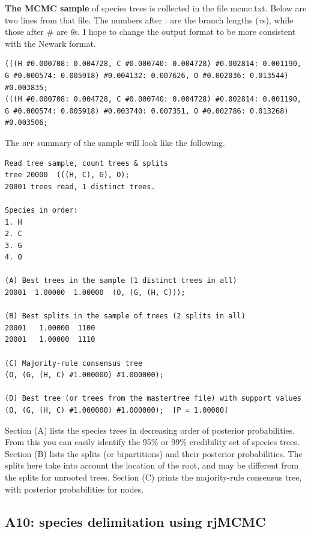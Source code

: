 \documentclass[a4paper]{book}
\numberwithin{equation}{section} \renewcommand{\baselinestretch}{0.55}
\begin{document}
\textbf{The MCMC sample} of species trees is collected in the file
mcmc.txt.  Below are two lines from that file.  The numbers after :
are the branch lengths ($\tau$s), while those after \# are $\theta$s.
I hope to change the output format to be more consistent with the
Newark format.

\begin{verbatim}
(((H #0.000708: 0.004728, C #0.000740: 0.004728) #0.002814: 0.001190, G #0.000574: 0.005918) #0.004132: 0.007626, O #0.002036: 0.013544) #0.003835;
(((H #0.000708: 0.004728, C #0.000740: 0.004728) #0.002814: 0.001190, G #0.000574: 0.005918) #0.003740: 0.007351, O #0.002786: 0.013268) #0.003506;
\end{verbatim}

The \textsc{bpp} summary of the sample will look like the following.
\begin{verbatim}
Read tree sample, count trees & splits
tree 20000  (((H, C), G), O);
20001 trees read, 1 distinct trees.

Species in order:
1. H
2. C
3. G
4. O

(A) Best trees in the sample (1 distinct trees in all)
20001  1.00000  1.00000  (O, (G, (H, C)));

(B) Best splits in the sample of trees (2 splits in all)
20001   1.00000  1100
20001   1.00000  1110

(C) Majority-rule consensus tree
(O, (G, (H, C) #1.000000) #1.000000);

(D) Best tree (or trees from the mastertree file) with support values
(O, (G, (H, C) #1.000000) #1.000000);  [P = 1.00000]
\end{verbatim}

Section (A) lists the species trees in decreasing order of posterior
probabilities.  From this you can easily identify the 95\% or 99\%
credibility set of species trees.  Section (B) lists the splits (or
bipartitions) and their posterior probabilities.  The splits here take
into account the location of the root, and may be different from the
splits for unrooted trees.  Section (C) prints the majority-rule
consensus tree, with posterior probabilities for nodes.


\subsection{A10: species delimitation using rjMCMC}
\end{document}
